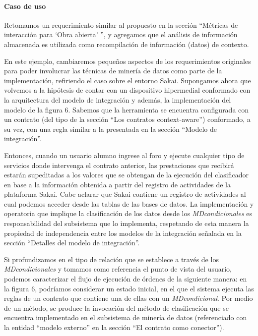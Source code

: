\paragraph{Caso de uso}

Retomamos un requerimiento similar al propuesto en la sección “Métricas
de interacción para ‘Obra abierta’ ”, y agregamos que el análisis de información
almacenada es utilizada como recompilación de información (datos) de
contexto.

En este ejemplo, cambiaremos pequeños aspectos de los requerimientos
originales para poder involucrar las técnicas de minería de datos como parte
de la implementación, refiriendo el caso sobre el entorno Sakai.
Supongamos ahora que volvemos a la hipótesis de contar con un dispositivo
hipermedial conformado con la arquitectura del modelo de integración y
además, la implementación del modelo de la figura 6. Sabemos que la herramienta
se encuentra configurada con un contrato (del tipo de la sección “Los
contratos context-aware”) conformado, a su vez, con una regla similar a la presentada
en la sección “Modelo de integración”.

Entonces, cuando un usuario alumno ingrese al foro y ejecute cualquier
tipo de servicios donde intervenga el contrato anterior, las prestaciones que
recibirá estarán supeditadas a los valores que se obtengan de la ejecución del
clasificador en base a la información obtenida a partir del registro de actividades
de la plataforma Sakai. Cabe aclarar que Sakai contiene un registro de
actividades al cual podemos acceder desde las tablas de las bases de datos.
La implementación y operatoria que implique la clasificación de los
datos desde los \textit{MDcondicionales} es responsabilidad del subsistema que
lo
implementa, respetando de esta manera la propiedad de independencia entre
los modelos de la integración señalada en la sección “Detalles del modelo de
integración”.

Si profundizamos en el tipo de relación que se establece a través de los
\textit{MDcondicionales} y tomamos como referencia el punto de vista del
usuario,
podemos caracterizar el flujo de ejecución de órdenes de la siguiente manera:
en la figura 6, podríamos considerar un estado inicial, en el que el sistema ejecuta
las reglas de un contrato que contiene una de ellas con un
\textit{MDcondicional}. Por medio de un método, se produce la invocación del
método
de clasificación que se encuentra implementado en el subsistema de minería
de datos (referenciado con la entidad “modelo externo” en la sección “El
contrato como conector”).

